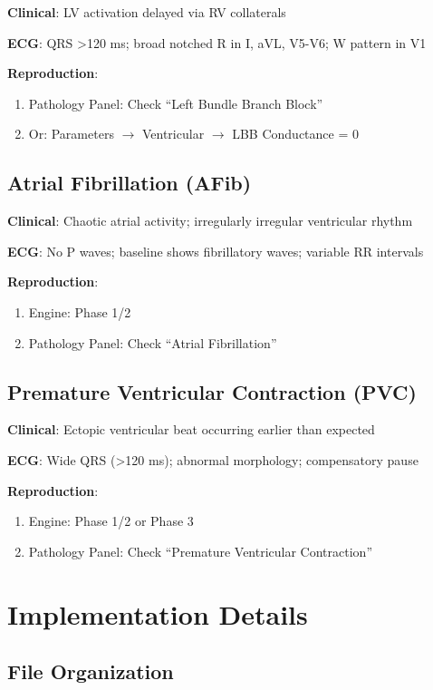 \documentclass[12pt,a4paper]{article}
\begin{document}
\textbf{Clinical}: LV activation delayed via RV collaterals

\textbf{ECG}: QRS >120 ms; broad notched R in I, aVL, V5-V6; W pattern in V1

\textbf{Reproduction}:
\begin{enumerate}
    \item Pathology Panel: Check ``Left Bundle Branch Block''
    \item Or: Parameters $\to$ Ventricular $\to$ LBB Conductance = 0
\end{enumerate}

\subsection{Atrial Fibrillation (AFib)}

\textbf{Clinical}: Chaotic atrial activity; irregularly irregular ventricular rhythm

\textbf{ECG}: No P waves; baseline shows fibrillatory waves; variable RR intervals

\textbf{Reproduction}:
\begin{enumerate}
    \item Engine: Phase 1/2
    \item Pathology Panel: Check ``Atrial Fibrillation''
\end{enumerate}

\subsection{Premature Ventricular Contraction (PVC)}

\textbf{Clinical}: Ectopic ventricular beat occurring earlier than expected

\textbf{ECG}: Wide QRS (>120 ms); abnormal morphology; compensatory pause

\textbf{Reproduction}:
\begin{enumerate}
    \item Engine: Phase 1/2 or Phase 3
    \item Pathology Panel: Check ``Premature Ventricular Contraction''
\end{enumerate}

\section{Implementation Details}

\subsection{File Organization}
\end{document}
